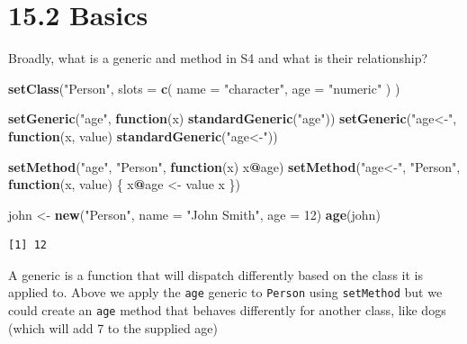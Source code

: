 \documentclass[]{book}
\newenvironment{Shaded}{\begin{snugshade}}{\end{snugshade}}
\newcommand{\ControlFlowTok}[1]{\textcolor[rgb]{0.13,0.29,0.53}{\textbf{#1}}}
\newcommand{\DataTypeTok}[1]{\textcolor[rgb]{0.13,0.29,0.53}{#1}}
\newcommand{\DecValTok}[1]{\textcolor[rgb]{0.00,0.00,0.81}{#1}}
\newcommand{\KeywordTok}[1]{\textcolor[rgb]{0.13,0.29,0.53}{\textbf{#1}}}
\newcommand{\NormalTok}[1]{#1}
\newcommand{\OperatorTok}[1]{\textcolor[rgb]{0.81,0.36,0.00}{\textbf{#1}}}
\newcommand{\StringTok}[1]{\textcolor[rgb]{0.31,0.60,0.02}{#1}}
\begin{document}
\hypertarget{basics-1}{%
\section*{15.2 Basics}\label{basics-1}}

Broadly, what is a generic and method in S4 and what is their relationship?

\begin{Shaded}
\begin{Highlighting}[]
\KeywordTok{setClass}\NormalTok{(}\StringTok{"Person"}\NormalTok{, }
  \DataTypeTok{slots =} \KeywordTok{c}\NormalTok{(}
    \DataTypeTok{name =} \StringTok{"character"}\NormalTok{, }
    \DataTypeTok{age =} \StringTok{"numeric"}
\NormalTok{  )}
\NormalTok{)}

\KeywordTok{setGeneric}\NormalTok{(}\StringTok{"age"}\NormalTok{, }\ControlFlowTok{function}\NormalTok{(x) }\KeywordTok{standardGeneric}\NormalTok{(}\StringTok{"age"}\NormalTok{))}
\KeywordTok{setGeneric}\NormalTok{(}\StringTok{"age<-"}\NormalTok{, }\ControlFlowTok{function}\NormalTok{(x, value) }\KeywordTok{standardGeneric}\NormalTok{(}\StringTok{"age<-"}\NormalTok{))}

\KeywordTok{setMethod}\NormalTok{(}\StringTok{"age"}\NormalTok{, }\StringTok{"Person"}\NormalTok{, }\ControlFlowTok{function}\NormalTok{(x) x}\OperatorTok{@}\NormalTok{age)}
\KeywordTok{setMethod}\NormalTok{(}\StringTok{"age<-"}\NormalTok{, }\StringTok{"Person"}\NormalTok{, }\ControlFlowTok{function}\NormalTok{(x, value) \{}
\NormalTok{  x}\OperatorTok{@}\NormalTok{age <-}\StringTok{ }\NormalTok{value}
\NormalTok{  x}
\NormalTok{\})}

\NormalTok{john <-}\StringTok{ }\KeywordTok{new}\NormalTok{(}\StringTok{"Person"}\NormalTok{, }\DataTypeTok{name =} \StringTok{"John Smith"}\NormalTok{, }\DataTypeTok{age =} \DecValTok{12}\NormalTok{)}
\KeywordTok{age}\NormalTok{(john)}
\end{Highlighting}
\end{Shaded}

\begin{verbatim}
[1] 12
\end{verbatim}

A generic is a function that will dispatch differently based on the class it is applied to. Above we apply the \texttt{age} generic to \texttt{Person} using \texttt{setMethod} but we could create an \texttt{age} method that behaves differently for another class, like dogs (which will add 7 to the supplied age)
\end{document}
